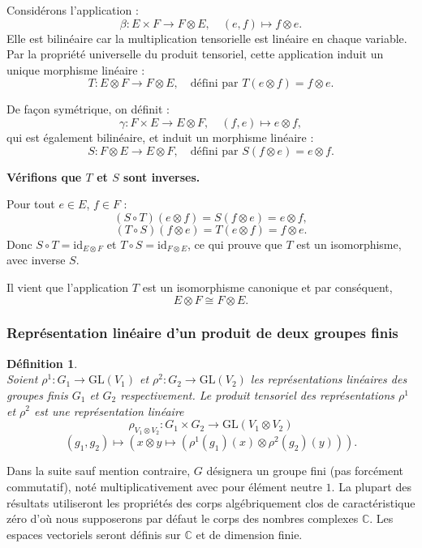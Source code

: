 \documentclass[a4paper, 14pt]{report}
\newtheorem{definition}{Définition}[section]
\begin{document}
\begin{onehalfspace}
{Considérons l'application :
\[
\beta : E \times F \to F \otimes E, \quad (e, f) \mapsto f \otimes e.
\]
Elle est bilinéaire car la multiplication tensorielle est linéaire en chaque variable. Par la propriété universelle du produit tensoriel, cette application induit un unique morphisme linéaire :
\[
T : E \otimes F \to F \otimes E, \quad \text{défini par } T(e \otimes f) = f \otimes e.
\]

De façon symétrique, on définit :
\[
\gamma : F \times E \to E \otimes F, \quad (f, e) \mapsto e \otimes f,
\]
qui est également bilinéaire, et induit un morphisme linéaire :
\[
S : F \otimes E \to E \otimes F, \quad \text{défini par } S(f \otimes e) = e \otimes f.
\]

\textbf{Vérifions que \( T \) et \( S \) sont inverses.}

Pour tout \( e \in E \), \( f \in F \) :
\[
(S \circ T)(e \otimes f) = S(f \otimes e) = e \otimes f,
\]
\[
(T \circ S)(f \otimes e) = T(e \otimes f) = f \otimes e.
\]
Donc \( S \circ T = \mathrm{id}_{E \otimes F} \) et \( T \circ S = \mathrm{id}_{F \otimes E} \), ce qui prouve que \( T \) est un isomorphisme, avec inverse \( S \).

Il vient que l'application \( T \) est un isomorphisme canonique et par conséquent,
\[
E \otimes F \cong F \otimes E.
\]




\subsubsection{Représentation linéaire d'un produit de deux groupes finis}

\begin{definition} \cite{renard2009groupes} \\
Soient \( \rho^1: G_1 \to \mathrm{GL}(V_1) \) et \( \rho^2: G_2 \to \mathrm{GL}(V_2) \) les représentations linéaires des groupes finis \( G_1 \) et \( G_2 \) respectivement. Le produit tensoriel des représentations \( \rho^1 \) et \( \rho^2 \) est une représentation linéaire 
	\[
	\rho_{V_1 \otimes V_2} : G_1 \times G_2 \to \mathrm{GL}(V_1 \otimes V_2)
	\]
	\[
	(g_1, g_2) \mapsto (x \otimes y \mapsto (\rho^1(g_1)(x) \otimes \rho^2(g_2)(y))).
	\]
\end{definition}

\vspace{2cm}

Dans la suite sauf mention contraire, \( G \) désignera un groupe fini (pas forcément commutatif), noté multiplicativement avec pour élément neutre \( 1 \). La plupart des résultats utiliseront les propriétés des corps algébriquement clos de caractéristique zéro d'où nous supposerons par défaut le corps des nombres complexes $\mathbb{C}$. Les espaces vectoriels seront définis sur $\mathbb{C}$ et de dimension finie.

}
\end{onehalfspace}
\end{document}

